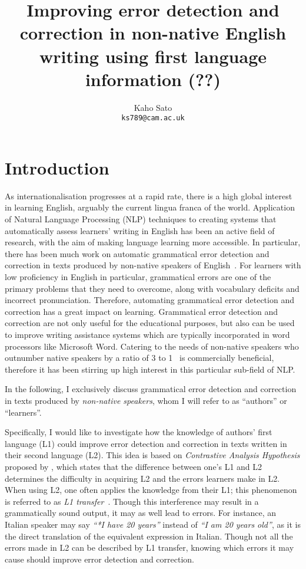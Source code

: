 \documentclass[11pt]{article}
\title{\color{red}Improving error detection and correction in non-native English writing using first language information (??)}
\author{
 Kaho Sato\\
  \texttt{ks789@cam.ac.uk}
}
\begin{document}
\maketitle

\section{Introduction}
As internationalisation progresses at a rapid rate, there is a high global 
interest in learning English, arguably the current lingua franca of the world. 
Application of Natural Language Processing (NLP) techniques to creating systems 
that automatically assess learners' writing in English has been an active field 
of research, with the aim of making language learning more accessible. In 
particular, there has been much work on automatic grammatical error detection 
and correction in texts produced by non-native speakers of 
English~\citep{izumi2003automatic, eeg2003automatic, han2006detecting, 
tetreault2008ups, de2008classifier, gamon2008using, gamon2010using, 
ng2014conll}.
For learners with low proficiency in English in particular, 
grammatical errors are one of the primary problems that they need to overcome,
along with vocabulary deficits and incorrect pronunciation. 
Therefore, automating grammatical error detection and correction has a great 
impact on learning. Grammatical error detection and correction are not only 
useful for the educational purposes, but also can be used to improve writing 
assistance systems which are typically incorporated in word processors like 
Microsoft Word. Catering to the needs of non-native speakers who outnumber native speakers by a ratio of 3 to 1~\citep{sussex1999david} is commercially 
beneficial, therefore it has been stirring up high interest in this particular 
sub-field of NLP.

In the following, I exclusively discuss grammatical error 
detection and correction in texts produced by \emph{non-native speakers}, whom I will refer to as ``authors'' or ``learners''.

\color{black}Specifically, I would like to investigate how the knowledge of authors' first 
language (L1) could improve error detection and correction in texts 
written in their second language (L2). This idea is based on \emph{Contrastive 
Analysis Hypothesis} proposed by \cite{lado1957linguistics}, which states that 
the difference between one's L1 and L2 determines the difficulty in acquiring L2 and the errors learners make in L2. 
When using L2, one often applies the knowledge from their L1; this phenomenon is referred to as {\em L1 transfer}~\citep{wanner1982language, frenck1997syntactic, 
dussias2003syntactic, nitschke2010first}. Though this interference may result in 
a grammatically sound output, it may as well lead to errors. For instance, an 
Italian speaker may say {\em ``*I have 20 years''} instead of {\em ``I am 20 years old''}, 
as it is the direct translation of the equivalent expression in Italian. Though 
not all the errors made in L2 can be described by L1 transfer, knowing which 
errors it may cause should improve error detection and correction.
\end{document}
